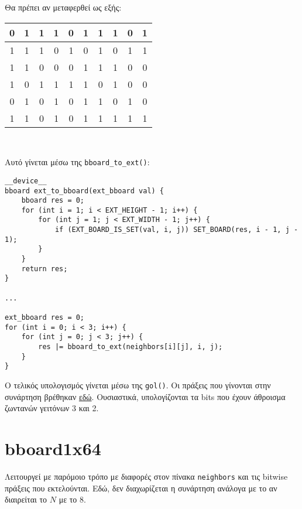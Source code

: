 \begin{center}
	Θα πρέπει αν μεταφερθεί ως εξής:\\
	\begin{tabular}{ | c | c | c | c | c | c | c | c | c | c |}
	\hline
	\cellcolor{blue!25}0 & \cellcolor{blue!25}1 & \cellcolor{blue!25}1 & \cellcolor{blue!25}1 & \cellcolor{blue!25}0 & \cellcolor{blue!25}1 & \cellcolor{blue!25}1 & \cellcolor{blue!25}1 & \cellcolor{blue!25}0 & \cellcolor{blue!25}1 \\ \hline
	\cellcolor{blue!25}1 & 1 & 1 & 0 & 1 & 0 & 1 & 0 & 1 & \cellcolor{blue!25}1 \\ \hline
	\cellcolor{blue!25}1 & 1 & 0 & 0 & 0 & 1 & 1 & 1 & 0 & \cellcolor{blue!25}0\\ \hline
	\cellcolor{blue!25}1 & 0 & 1 & 1 & 1 & 1 & 0 & 1 & 0 & \cellcolor{blue!25}0\\ \hline
	\cellcolor{blue!25}0 & 1 & 0 & 1 & 0 & 1 & 1 & 0 & 1 & \cellcolor{blue!25}0\\ \hline
	\cellcolor{blue!25}1 & \cellcolor{blue!25}1 & \cellcolor{blue!25}0 & \cellcolor{blue!25}1 & \cellcolor{blue!25}0 & \cellcolor{blue!25}1 & \cellcolor{blue!25}1 & \cellcolor{blue!25}1 & \cellcolor{blue!25}1 & \cellcolor{blue!25}1\\ \hline
	\end{tabular} \
\end{center}

Αυτό γίνεται μέσω της \lstinline!bboard_to_ext()!:
\begin{lstlisting}[caption={Extend bboard}, escapechar=$, breaklines=true]
__device__
bboard ext_to_bboard(ext_bboard val) {
    bboard res = 0;
    for (int i = 1; i < EXT_HEIGHT - 1; i++) {
        for (int j = 1; j < EXT_WIDTH - 1; j++) {
            if (EXT_BOARD_IS_SET(val, i, j)) SET_BOARD(res, i - 1, j - 1);
        }
    }
    return res;
}

...

ext_bboard res = 0;
for (int i = 0; i < 3; i++) {
    for (int j = 0; j < 3; j++) {
        res |= bboard_to_ext(neighbors[i][j], i, j);
    }
}
\end{lstlisting}

Ο τελικός υπολογισμός γίνεται μέσω της \lstinline!gol()!.
Οι πράξεις που γίνονται στην συνάρτηση βρέθηκαν \href{http://www.onjava.com/pub/a/onjava/2005/02/02/bitsets.html?page=2}{εδώ}.
Ουσιαστικά, υπολογίζονται τα bits που έχουν άθροισμα ζωντανών γειτόνων 3 και 2.

\section{bboard1x64}

Λειτουργεί με παρόμοιο τρόπο με διαφορές στον πίνακα \lstinline!neighbors! και τις bitwise πράξεις που εκτελούνται.
Εδώ, δεν διαχωρίζεται η συνάρτηση ανάλογα με το αν διαιρείται το $N$ με το 8.
